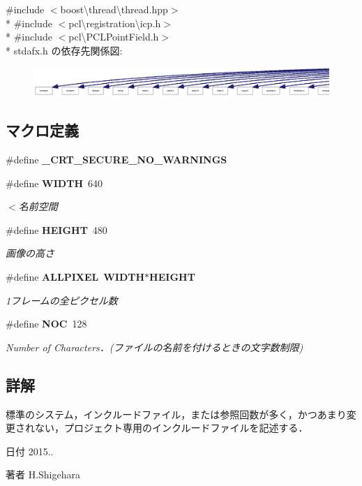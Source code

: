 {\ttfamily \#include $<$boost\textbackslash{}thread\textbackslash{}thread.\-hpp$>$}\\*
{\ttfamily \#include $<$pcl\textbackslash{}registration\textbackslash{}icp.\-h$>$}\\*
{\ttfamily \#include $<$pcl\textbackslash{}\-P\-C\-L\-Point\-Field.\-h$>$}\\*
stdafx.\-h の依存先関係図\-:\nopagebreak
\begin{figure}[H]
\begin{center}
\leavevmode
\includegraphics[width=350pt]{stdafx_8h__incl}
\end{center}
\end{figure}
\subsection*{マクロ定義}
\begin{DoxyCompactItemize}
\item 
\#define {\bf \-\_\-\-C\-R\-T\-\_\-\-S\-E\-C\-U\-R\-E\-\_\-\-N\-O\-\_\-\-W\-A\-R\-N\-I\-N\-G\-S}
\item 
\#define {\bf W\-I\-D\-T\-H}~640
\begin{DoxyCompactList}\small\item\em $<$名前空間 \end{DoxyCompactList}\item 
\#define {\bf H\-E\-I\-G\-H\-T}~480
\begin{DoxyCompactList}\small\item\em 画像の高さ \end{DoxyCompactList}\item 
\#define {\bf A\-L\-L\-P\-I\-X\-E\-L}~{\bf W\-I\-D\-T\-H}$\ast${\bf H\-E\-I\-G\-H\-T}
\begin{DoxyCompactList}\small\item\em 1フレームの全ピクセル数 \end{DoxyCompactList}\item 
\#define {\bf N\-O\-C}~128
\begin{DoxyCompactList}\small\item\em Number of Characters．(ファイルの名前を付けるときの文字数制限) \end{DoxyCompactList}\end{DoxyCompactItemize}


\subsection{詳解}
標準のシステム，インクルードファイル，または参照回数が多く，かつあまり変更されない，プロジェクト専用のインクルードファイルを記述する． \begin{DoxyDate}{日付}
2015.. 
\end{DoxyDate}
\begin{DoxyAuthor}{著者}
H.\-Shigehara 
\end{DoxyAuthor}


